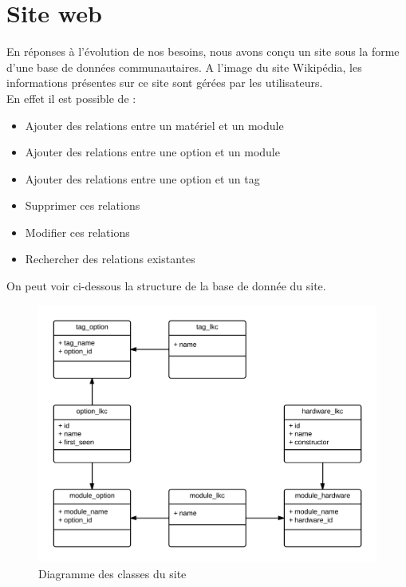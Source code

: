 \documentclass[16pts]{report}
\begin{document}
	\newpage
    \section{Site web}
    \label{sec:Site web}

    En réponses à l'évolution de nos besoins, nous avons conçu un site sous 
    la forme d'une base de données communautaires. A l'image du site 
    Wikipédia, les informations présentes sur ce site sont gérées par 
    les utilisateurs.\\

    En effet il est possible de : \\

    \begin{itemize}
        \item Ajouter des relations entre un matériel et un module
        \item Ajouter des relations entre une option et un module
        \item Ajouter des relations entre une option et un tag
        \item Supprimer ces relations
        \item Modifier ces relations
        \item Rechercher des relations existantes
    \end{itemize} 

    On peut voir ci-dessous la structure de la base de donnée du site. \\

    \begin{figure}[H]
        \includegraphics[scale=0.2]{./illustrations/diagramme_classes_site.png}
        \centering
        \caption{Diagramme des classes du site}
        \label{fig:DiagSite}
    \end{figure}
\end{document}
